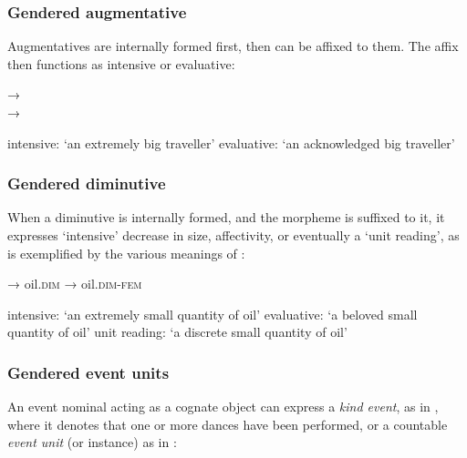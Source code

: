 \subsubsection{Gendered augmentative}

Augmentatives are internally formed first, then  can be affixed to
them. The affix then functions as intensive or evaluative:

\begin{exe}
  \ex\label{ex:fassi:9}   →
   \\ →
   
  \begin{xlist}
    \ex\label{ex:fassi:9a} intensive: `an extremely big traveller'
    \ex\label{ex:fassi:9b} evaluative: `an acknowledged big traveller'
  \end{xlist}
\end{exe}

\subsubsection{Gendered diminutive}

When a diminutive is internally formed, and the morpheme  is suffixed
to it, it expresses `intensive' decrease in size, affectivity, or eventually a
`unit reading', as is exemplified by the various meanings of :

\begin{exe}
  \ex\label{ex:fassi:10}   →  oil.\textsc{dim}  →  oil.\textsc{dim-fem}
  \begin{xlist}
    \ex\label{ex:fassi:10a} intensive: `an extremely small quantity of oil'
    \ex\label{ex:fassi:10b} evaluative: `a beloved small quantity of oil'
    \ex\label{ex:fassi:10c} unit reading: `a discrete small quantity of oil'
  \end{xlist}
\end{exe}

\subsubsection{Gendered event units}

An event nominal acting as a cognate object can express a \textit{kind event},
as in , where it denotes that one or more dances have been
performed, or a countable \textit{event unit} (or instance) as in
:

